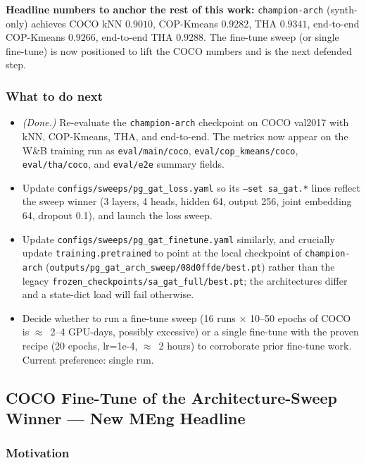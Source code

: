 \textbf{Headline numbers to anchor the rest of this work:} \texttt{champion-arch} (synth-only) achieves COCO kNN $0.9010$, COP-Kmeans $0.9282$, THA $0.9341$, end-to-end COP-Kmeans $0.9266$, end-to-end THA $0.9288$. The fine-tune sweep (or single fine-tune) is now positioned to lift the COCO numbers and is the next defended step.

\subsubsection{What to do next}

\begin{itemize}
    \item \emph{(Done.)} Re-evaluate the \texttt{champion-arch} checkpoint on COCO val2017 with kNN, COP-Kmeans, THA, and end-to-end. The metrics now appear on the W\&B training run as \texttt{eval/main/coco}, \texttt{eval/cop\_kmeans/coco}, \texttt{eval/tha/coco}, and \texttt{eval/e2e} summary fields.
    \item Update \texttt{configs/sweeps/pg\_gat\_loss.yaml} so its \texttt{--set sa\_gat.*} lines reflect the sweep winner (3 layers, 4 heads, hidden 64, output 256, joint embedding 64, dropout 0.1), and launch the loss sweep.
    \item Update \texttt{configs/sweeps/pg\_gat\_finetune.yaml} similarly, and crucially update \texttt{training.pretrained} to point at the local checkpoint of \texttt{champion-arch} (\texttt{outputs/pg\_gat\_arch\_sweep/08d0ffde/best.pt}) rather than the legacy \texttt{frozen\_checkpoints/sa\_gat\_full/best.pt}; the architectures differ and a state-dict load will fail otherwise.
    \item Decide whether to run a fine-tune sweep (16 runs $\times$ 10--50 epochs of COCO is $\approx$~2--4 GPU-days, possibly excessive) or a single fine-tune with the proven recipe (20 epochs, lr=1e-4, $\approx$~2 hours) to corroborate prior fine-tune work. Current preference: single run.
\end{itemize}

\subsection{COCO Fine-Tune of the Architecture-Sweep Winner --- New MEng Headline}

\subsubsection{Motivation}

